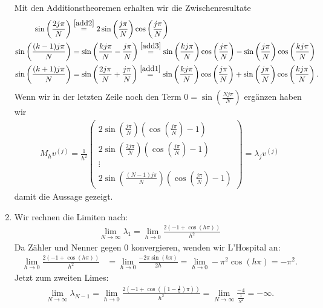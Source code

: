 \begin{solution}
\begin{enumerate}[label = \textbf{\alph*)}]
Mit den Additionstheoremen erhalten wir die Zwischenresultate
\begin{align*}
  \sin\left(\frac{2j\pi}{N}\right) &\stackrel{\eqref{add2}}{=}
  2\sin\left(\frac{j\pi}{N}\right)\cos\left(\frac{j\pi}{N}\right) \\
  \sin\left(\frac{(k-1)j\pi}{N}\right) &= \sin\left(\frac{kj\pi}{N}- \frac{j\pi}{N}\right)\stackrel{\eqref{add3}}{=}
  \sin\left(\frac{kj\pi}{N}\right)\cos\left(\frac{j\pi}{N}\right)
  - \sin\left(\frac{j\pi}{N}\right)\cos\left(\frac{kj\pi}{N}\right) \\
  \sin\left(\frac{(k+1)j\pi}{N}\right) &= \sin\left(\frac{2j\pi}{N}+ \frac{j\pi}{N}\right)
  \stackrel{\eqref{add1}}{=}
  \sin\left(\frac{kj\pi}{N}\right)\cos\left(\frac{j\pi}{N}\right)
  + \sin\left(\frac{j\pi}{N}\right)\cos\left(\frac{kj\pi}{N}\right).
\end{align*}
Wenn wir in der letzten Zeile noch den Term
$0 = \sin\left(\frac{Nj\pi}{N}\right)$ ergänzen haben wir
\begin{align*}
  M_h v^{(j)} = \frac{1}{h^2}\begin{pmatrix}
    2\sin\left(\frac{j\pi}{N}\right)\left(\cos\left(\frac{j\pi}{N}\right) - 1\right) \\
    2\sin\left(\frac{2j\pi}{N}\right)\left(\cos\left(\frac{j\pi}{N}\right) - 1\right)\\
    \vdots \\
    2\sin\left(\frac{(N-1)j\pi}{N}\right)\left(\cos\left(\frac{j\pi}{N}\right) - 1\right)
  \end{pmatrix}
  = \lambda_j v^{(j)}
\end{align*}
damit die Aussage gezeigt.
\item Wir rechnen die Limiten nach:
\begin{align*}
  \lim_{N \rightarrow \infty} \lambda_1 =
  \lim_{h \rightarrow 0} \frac{2\left(-1 + \cos\left(h\pi\right)\right)}{h^2}
\end{align*}
Da Zähler und Nenner gegen $0$ konvergieren, wenden wir L'Hospital an:
\begin{align*}
  \lim_{h \rightarrow 0} \frac{2\left(-1 + \cos\left(h\pi\right)\right)}{h^2}
  &= \lim_{h \rightarrow 0} \frac{-2\pi\sin(h\pi)}{2h}
  = \lim_{h \rightarrow 0} -\pi^2\cos(h\pi) = -\pi^2.
\end{align*}
Jetzt zum zweiten Limes:
\begin{align*}
\lim_{N \rightarrow \infty} \lambda_{N-1} =
\lim_{h \rightarrow 0} \frac{2\left(-1 + \cos\left((1 - \frac{1}{h})\pi\right)\right)}{h^2}
= \lim_{N \rightarrow \infty} \frac{-4}{\frac{1}{N^2}} = -\infty.
\end{align*}
\end{enumerate}
\end{solution}
